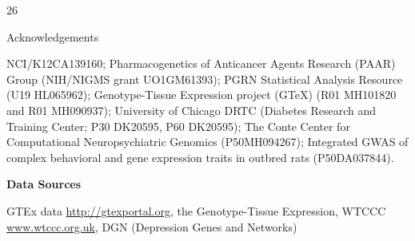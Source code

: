 \documentclass[final]{beamer}
\newcommand{\ColWidth}{26}
\begin{document}
\begin{frame}{}
\begin{textblock}{\ColWidth}
\begin{block}{Acknowledgements}
\begin{tiny}

NCI/K12CA139160; Pharmacogenetics of Anticancer Agents Research (PAAR) Group (NIH/NIGMS grant UO1GM61393); PGRN Statistical Analysis Resource (U19 HL065962); Genotype-Tissue Expression project (GTeX) (R01 MH101820 and R01 MH090937); University of Chicago DRTC (Diabetes Research and Training Center; P30 DK20595, P60 DK20595); The Conte Center for Computational Neuropsychiatric Genomics (P50MH094267); Integrated GWAS of complex behavioral and gene expression traits in outbred rats (P50DA037844).\\

\bigskip

\textbf{Data Sources}

GTEx data \url{http://gtexportal.org}, the Genotype-Tissue Expression, WTCCC \url{www.wtccc.org.uk}, DGN (Depression Genes and Networks)

\end{tiny}


\end{block}

\end{textblock}



\end{frame}
\end{document}
